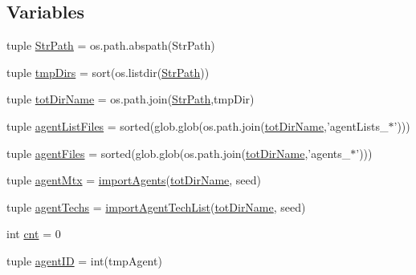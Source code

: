 \subsection*{Variables}
\begin{DoxyCompactItemize}
\item 
tuple \hyperlink{namespacea__agentstechs_characterization_a02836d75539fad783b19b5d9daf7912d}{Str\-Path} = os.\-path.\-abspath(Str\-Path)
\item 
tuple \hyperlink{namespacea__agentstechs_characterization_a7caffbeb121cb9f1ec04fe723dbd82e8}{tmp\-Dirs} = sort(os.\-listdir(\hyperlink{namespacea__agentstechs_characterization_a02836d75539fad783b19b5d9daf7912d}{Str\-Path}))
\item 
tuple \hyperlink{namespacea__agentstechs_characterization_aef56518a9f18115f3a3a8f71b947178e}{tot\-Dir\-Name} = os.\-path.\-join(\hyperlink{namespacea__agentstechs_characterization_a02836d75539fad783b19b5d9daf7912d}{Str\-Path},tmp\-Dir)
\item 
tuple \hyperlink{namespacea__agentstechs_characterization_a4ba390eab6e08737d271c5c795f145b4}{agent\-List\-Files} = sorted(glob.\-glob(os.\-path.\-join(\hyperlink{namespacea__agentstechs_characterization_aef56518a9f18115f3a3a8f71b947178e}{tot\-Dir\-Name},'agent\-Lists\-\_\-$\ast$')))
\item 
tuple \hyperlink{namespacea__agentstechs_characterization_a1b881f250d738c26411d0f968251f25a}{agent\-Files} = sorted(glob.\-glob(os.\-path.\-join(\hyperlink{namespacea__agentstechs_characterization_aef56518a9f18115f3a3a8f71b947178e}{tot\-Dir\-Name},'agents\-\_\-$\ast$')))
\item 
tuple \hyperlink{namespacea__agentstechs_characterization_a80e69ab0323f9f10c85569f737f6ef12}{agent\-Mtx} = \hyperlink{namespacea__agentstechs_characterization_a921a22f00acd46ee23da983ac540670b}{import\-Agents}(\hyperlink{namespacea__agentstechs_characterization_aef56518a9f18115f3a3a8f71b947178e}{tot\-Dir\-Name}, seed)
\item 
tuple \hyperlink{namespacea__agentstechs_characterization_ae28225ae1424be19f35602a5ed678424}{agent\-Techs} = \hyperlink{namespacea__agentstechs_characterization_af28c4f175951326a2cb8b7f36dfb7ef7}{import\-Agent\-Tech\-List}(\hyperlink{namespacea__agentstechs_characterization_aef56518a9f18115f3a3a8f71b947178e}{tot\-Dir\-Name}, seed)
\item 
int \hyperlink{namespacea__agentstechs_characterization_a84e4c9fac6759db4abed8669958b9e79}{cnt} = 0
\item 
tuple \hyperlink{namespacea__agentstechs_characterization_af1b083a13ad9299a14d222ca21b56018}{agent\-I\-D} = int(tmp\-Agent)

\end{DoxyCompactItemize}
